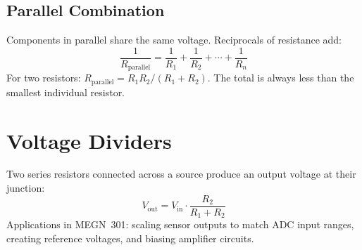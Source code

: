 \subsection{Parallel Combination}
Components in parallel share the same voltage. Reciprocals of resistance add:
\begin{equation}
\frac{1}{R_{\text{parallel}}} = \frac{1}{R_1} + \frac{1}{R_2} + \cdots + \frac{1}{R_n}
\end{equation}
For two resistors: $R_{\text{parallel}} = R_1 R_2 / (R_1 + R_2)$. The total is always less than the smallest individual resistor.


\section{Voltage Dividers}

Two series resistors connected across a source produce an output voltage at their junction:
\begin{equation}
V_{\text{out}} = V_{\text{in}} \cdot \frac{R_2}{R_1 + R_2}
\end{equation}
Applications in MEGN~301: scaling sensor outputs to match ADC input ranges, creating reference voltages, and biasing amplifier circuits.

